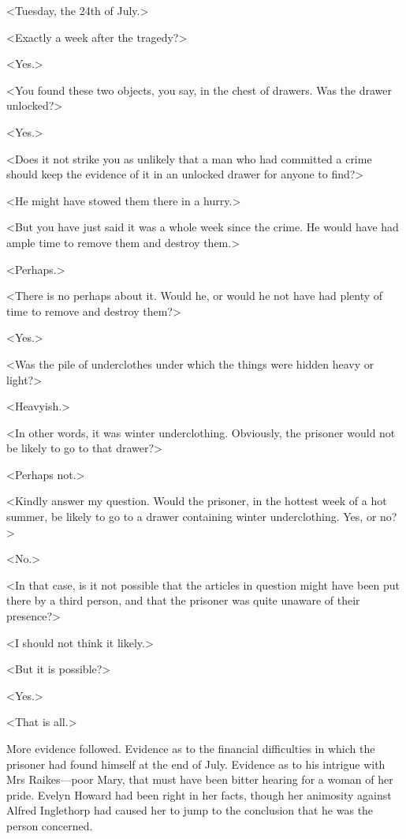  <Tuesday, the 24th of July.> 

 <Exactly a week after the tragedy?> 

 <Yes.> 

 <You found these two objects, you say, in the chest of drawers. Was the drawer unlocked?> 

 <Yes.> 

 <Does it not strike you as unlikely that a man who had committed a crime should keep the evidence of it in an unlocked drawer for anyone to find?> 

 <He might have stowed them there in a hurry.> 

 <But you have just said it was a whole week since the crime. He would have had ample time to remove them and destroy them.> 

 <Perhaps.> 

 <There is no perhaps about it. Would he, or would he not have had plenty of time to remove and destroy them?> 

 <Yes.> 

 <Was the pile of underclothes under which the things were hidden heavy or light?> 

 <Heavyish.> 

 <In other words, it was winter underclothing. Obviously, the prisoner would not be likely to go to that drawer?> 

 <Perhaps not.> 

 <Kindly answer my question. Would the prisoner, in the hottest week of a hot summer, be likely to go to a drawer containing winter underclothing. Yes, or no?> 

 <No.> 

 <In that case, is it not possible that the articles in question might have been put there by a third person, and that the prisoner was quite unaware of their presence?> 

 <I should not think it likely.> 

 <But it is possible?> 

 <Yes.> 

 <That is all.> 

 More evidence followed. Evidence as to the financial difficulties in which the prisoner had found himself at the end of July. Evidence as to his intrigue with Mrs Raikes—poor Mary, that must have been bitter hearing for a woman of her pride. Evelyn Howard had been right in her facts, though her animosity against Alfred Inglethorp had caused her to jump to the conclusion that he was the person concerned. 

